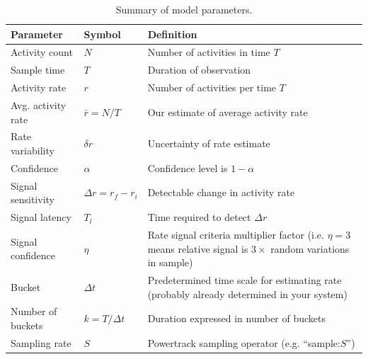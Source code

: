\documentclass{article}
\begin{document}
\begin{table} [!h]
    \begin{tabular}{p{3.0cm}| p{1.9cm}|p{5.9cm}}
     \hline
Parameter  & Symbol & Definition \\
\hline	
Activity count & $N$ & Number of activities in time $T$\\
Sample time & $T$	& Duration of observation\\
Activity rate & $r$	& Number of activities per time $T$\\
Avg. activity rate & $\bar{r} = N/T$ & Our estimate of average activity rate \\
Rate variability & $\delta r$	& Uncertainty of rate estimate \\
Confidence & $\alpha$ & Confidence level is $1-\alpha$\\
Signal sensitivity & $\Delta r=r_{f}-r_{i}$ & Detectable change in activity rate \\
Signal latency & $T_l$ & Time required to detect $\Delta r$  \\
Signal confidence & $\eta$ & Rate signal criteria multiplier factor (i.e. $\eta = 3$ means relative signal is $3 \times$ random variations in sample) \\
Bucket & $\Delta t$ & Predetermined time scale for estimating rate (probably already determined in your system)\\
Number of buckets & $k=T/\Delta t$ & Duration expressed in number of  buckets \\
Sampling rate & $S$	& Powertrack sampling operator (e.g. ``sample:$S$'') \\
\hline
\end{tabular}
\caption{Summary of model parameters.}
\label{tab:summary}
\end{table}
\end{document}
